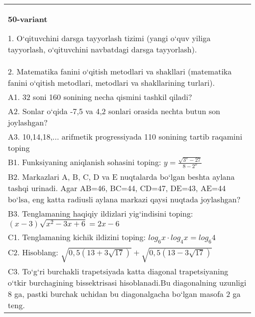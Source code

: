 \documentclass{article}
\begin{document}
\begin{tabular}{m{17cm}}
\textbf{50-variant}

1. O‘qituvchini darsga tayyorlash tizimi (yangi o‘quv yiliga tayyorlash, o‘qituvchini navbatdagi darsga tayyorlash). \\
2. Matematika fanini o‘qitish metodlari va shakllari (matematika fanini o‘qitish metodlari, metodlari va shakllarining turlari). \\
A1. 32 soni 160 sonining necha qismini tashkil qiladi? \\
A2. Sonlar o‘qida -7,5 va 4,2 sonlari orasida nechta butun son joylashgan? \\
A3. 10,14,18,... arifmetik progressiyada 110 sonining tartib raqamini toping \\
B1. Funksiyaning aniqlanish sohasini toping: \(y = \frac{\sqrt{3^{x} - 27}}{8 - 2^{x}}\) \\
B2. Markazlari A, B, C, D va E nuqtalarda bo‘lgan beshta aylana tashqi urinadi. Agar AB=46, BC=44, CD=47, DE=43, AE=44 bo‘lsa, eng katta radiusli aylana markazi qaysi nuqtada joylashgan? \\
B3. Tenglamaning haqiqiy ildizlari yig‘indisini toping: \((x-3) \sqrt{x^{2} - 3x + 6} = 2x - 6\) \\
C1. Tenglamaning kichik ildizini toping: \(log_{6}x \cdot log_{4}x = log_{6}4\) \\
C2. Hisoblang: \(\sqrt{0,5 (13 + 3\sqrt{17}) } + \sqrt{0,5 (13 - 3\sqrt{17}) }\) \\
C3. To‘g‘ri burchakli trapetsiyada katta diagonal trapetsiyaning o‘tkir burchagining bissektrisasi hisoblanadi.Bu diagonalning uzunligi 8 ga, pastki burchak uchidan bu diagonalgacha bo‘lgan masofa 2 ga teng. \\

\end{tabular}
\vspace{1cm}
\end{document}
